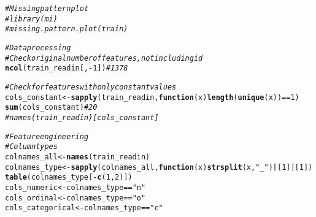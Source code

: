 \documentclass{article}\usepackage[]{graphicx}\usepackage[]{color}
\makeatletter
\newcommand{\hlnum}[1]{\textcolor[rgb]{0.686,0.059,0.569}{#1}}%
\newcommand{\hlstr}[1]{\textcolor[rgb]{0.192,0.494,0.8}{#1}}%
\newcommand{\hlcom}[1]{\textcolor[rgb]{0.678,0.584,0.686}{\textit{#1}}}%
\newcommand{\hlopt}[1]{\textcolor[rgb]{0,0,0}{#1}}%
\newcommand{\hlstd}[1]{\textcolor[rgb]{0.345,0.345,0.345}{#1}}%
\newcommand{\hlkwa}[1]{\textcolor[rgb]{0.161,0.373,0.58}{\textbf{#1}}}%
\newcommand{\hlkwb}[1]{\textcolor[rgb]{0.69,0.353,0.396}{#1}}%
\newcommand{\hlkwc}[1]{\textcolor[rgb]{0.333,0.667,0.333}{#1}}%
\newcommand{\hlkwd}[1]{\textcolor[rgb]{0.737,0.353,0.396}{\textbf{#1}}}%
\newenvironment{kframe}{%
 \def\at@end@of@kframe{}%
 \ifinner\ifhmode%
  \def\at@end@of@kframe{\end{minipage}}%
  \begin{minipage}{\columnwidth}%
 \fi\fi%
 \def\FrameCommand##1{\hskip\@totalleftmargin \hskip-\fboxsep
 \colorbox{shadecolor}{##1}\hskip-\fboxsep
     \hskip-\linewidth \hskip-\@totalleftmargin \hskip\columnwidth}%
 \MakeFramed {\advance\hsize-\width
   \@totalleftmargin\z@ \linewidth\hsize
   \@setminipage}}%
 {\par\unskip\endMakeFramed%
 \at@end@of@kframe}
\newenvironment{knitrout}{}{} %
\makeatother
\begin{document}
\begin{knitrout}
\begin{kframe}
\begin{alltt}
\hlcom{# Missing pattern plot}
\hlcom{# library(mi)}
\hlcom{# missing.pattern.plot(train)}

\hlcom{# Data processing}
\hlcom{# Check original number of features, not including id}
\hlkwd{ncol}\hlstd{(train_readin[,} \hlopt{-}\hlnum{1}\hlstd{])} \hlcom{# 1378}

\hlcom{# Check for features with only constant values}
\hlstd{cols_constant} \hlkwb{<-} \hlkwd{sapply}\hlstd{(train_readin,} \hlkwa{function}\hlstd{(}\hlkwc{x}\hlstd{)} \hlkwd{length}\hlstd{(}\hlkwd{unique}\hlstd{(x))} \hlopt{==} \hlnum{1}\hlstd{)}
\hlkwd{sum}\hlstd{(cols_constant)} \hlcom{# 20}
\hlcom{# names(train_readin)[cols_constant]}

\hlcom{# Feature engineering}
\hlcom{# Column types}
\hlstd{colnames_all} \hlkwb{<-} \hlkwd{names}\hlstd{(train_readin)}
\hlstd{colnames_type} \hlkwb{<-} \hlkwd{sapply}\hlstd{(colnames_all,} \hlkwa{function}\hlstd{(}\hlkwc{x}\hlstd{)} \hlkwd{strsplit}\hlstd{(x,} \hlstr{"_"}\hlstd{)[[}\hlnum{1}\hlstd{]][}\hlnum{1}\hlstd{])}
\hlkwd{table}\hlstd{(colnames_type[}\hlopt{-}\hlkwd{c}\hlstd{(}\hlnum{1}\hlstd{,} \hlnum{2}\hlstd{)])}
\hlstd{cols_numeric} \hlkwb{<-} \hlstd{colnames_type} \hlopt{==} \hlstr{"n"}
\hlstd{cols_ordinal} \hlkwb{<-} \hlstd{colnames_type} \hlopt{==} \hlstr{"o"}
\hlstd{cols_categorical} \hlkwb{<-} \hlstd{colnames_type} \hlopt{==} \hlstr{"c"}


\end{alltt}
\end{kframe}
\end{knitrout}
\end{document}
